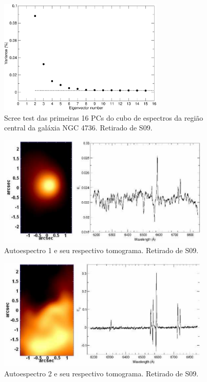 \begin{figure}
    \includegraphics[width=0.7\textwidth]{figuras/figSteiner2009fig1.pdf}
    \caption[{\em Scree test} na galáxia NGC 4736.]
    {Scree test das primeiras 16 PCs do cubo de espectros da região central da galáxia NGC 4736. Retirado de
    S09.}
    \label{fig:S09scree}
\end{figure}

\begin{figure}
    \includegraphics[width=0.9\textwidth]{figuras/figSteiner2009figA1.pdf}
    \caption[Tomograma e autoespectro 1 da galáxia NGC 4736.]
    {Autoespectro 1 e seu respectivo tomograma. Retirado de S09.}
    \label{fig:S09eigspec1}
\end{figure}

\begin{figure}
    \includegraphics[width=0.9\textwidth]{figuras/figSteiner2009figA2.pdf}
    \caption[Tomograma e autoespectro 2 da galáxia NGC 4736.]
    {Autoespectro 2 e seu respectivo tomograma. Retirado de S09.}
    \label{fig:S09eigspec2}
\end{figure}

